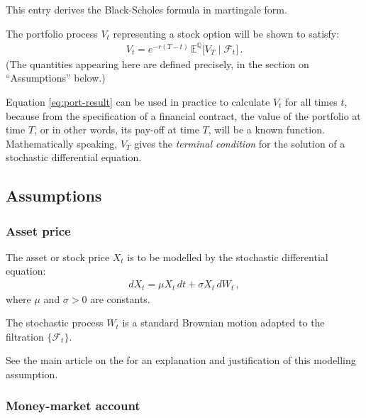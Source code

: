 \documentclass[12pt]{article}
\newcommand{\sF}{\mathcal{F}}
\newcommand{\EQ}{\mathbb{E}^\mathbb{Q}}
\begin{document}

\tableofcontents

\medskip

This entry derives the Black-Scholes formula in martingale form.

The portfolio process $V_t$ representing a stock option
will be shown to satisfy:
\begin{align}\label{eq:port-result}
V_t = e^{-r(T-t)} \, \EQ\bigl[ V_T \mid \sF_t \bigr]\,.
\end{align}
(The quantities appearing here are defined precisely,
in the section on ``Assumptions'' below.)

Equation \eqref{eq:port-result}
can be used in practice to calculate $V_t$ for all times $t$,
because from the specification of a financial contract,
the value of the portfolio at time $T$,
or in other words, its pay-off at time $T$,
will be a known function.
Mathematically speaking, $V_T$ gives the \emph{terminal condition}
for the solution of a stochastic differential equation.

\subsection{Assumptions}

\subsubsection{Asset price}

The asset or stock price $X_t$ is to be modelled by the stochastic
differential equation:
\begin{align}\label{eq:stock}
d X_t = \mu X_t \, dt + \sigma X_t \, dW_t\,,
\end{align}
where $\mu$ and $\sigma > 0$ are constants.

The stochastic process $W_t$ is a standard Brownian motion
adapted to the filtration $\{ \sF_t \}$.

See the main article 
on the 
for an explanation and justification of this modelling assumption.

\subsubsection{Money-market account}
\end{document}
